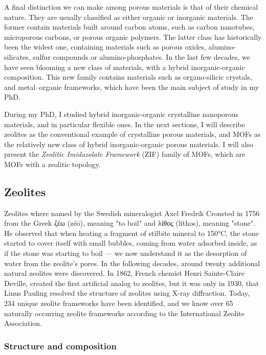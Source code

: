 \documentclass[thesis]{subfiles}
\begin{document}
A final distinction we can make among porous materials is that of their chemical
nature. They are usually classified as either organic or inorganic materials.
The former contain materials built around carbon atoms, such as carbon
nanotubes, microporous carbons, or porous organic polymers. The latter class has
historically been the widest one, containing materials such as porous oxides,
alumino-silicates, sulfur compounds or alumino-phosphates. In the last few
decades, we have seen blooming a new class of materials, with a hybrid
inorganic-organic composition. This new family contains materials such as
organo-silicic crystals, and metal--organic frameworks, which have been the main
subject of study in my PhD.

During my PhD, I studied hybrid inorganic-organic crystalline nanoporous
materials, and in particular flexible ones. In the next sections, I will
describe zeolites as the conventional example of crystalline porous materials,
and MOFs as the relatively new class of hybrid inorganic-organic porous
materials. I will also present the \emph{Zeolitic Imidazolate Framework} (ZIF)
family of MOFs, which are MOFs with a zeolitic topology.

\subsection{Zeolites}

Zeolites where named by the Swedish mineralogist Axel Fredrik Cronsted in
1756\cite{Ferey2001} from the Greek \textgreek{ζέω} (zéō), meaning "to boil" and
\textgreek{λίθος} (líthos), meaning "stone". He observed that when heating a
fragment of stilbite mineral to 150°C, the stone started to cover itself with
small bubbles, coming from water adsorbed inside, as if the stone was starting
to boil --- we now understand it as the desorption of water from the zeolite's
pores. In the following decades, around twenty additional natural zeolites were
discovered. In 1862, French chemist Henri Sainte-Claire Deville, created the
first artificial analog to zeolites, but it was only in 1930, that Linus Pauling
resolved the structure of zeolites using X-ray diffraction. Today, 234 unique
zeolite frameworks have been identified, and we know over 65 naturally occurring
zeolite frameworks according to the International Zeolite Association\cite{iza-website}.

\subsubsection{Structure and composition}
\end{document}
